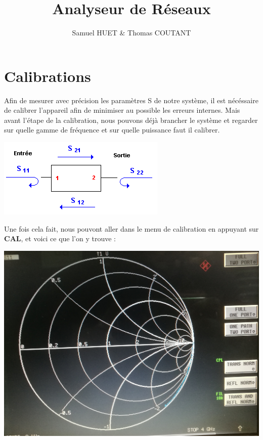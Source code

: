 \documentclass[a4paper,12pt]{report}            %
\author{Samuel HUET \& Thomas COUTANT}
\title{\huge{\textbf{Analyseur de Réseaux}}}
\begin{document}
\maketitle
\renewcommand{\contentsname}{SOMMAIRE} %
\tableofcontents

\chapter{Calibrations}

Afin de mesurer avec précision les paramètres S de notre système, il est nécéssaire de
calibrer l'appareil afin de minimiser au possible les erreurs internes. Mais avant l'étape
de la calibration, nous pouvons déjà brancher le système et regarder sur quelle gamme de
fréquence et sur quelle puissance faut il calibrer. 

\begin{center}\includegraphics[scale = 0.8]{pic/S.png}\\ \end{center}

Une fois cela fait, nous pouvont aller
dans le menu de calibration en appuyant sur \textbf{CAL}, et voici ce que l'on y trouve :

\begin{center}\includegraphics[scale = 0.12]{pic/Calib.jpg}\\ \end{center}
\end{document}

